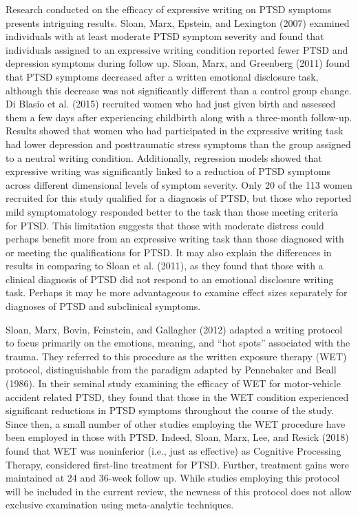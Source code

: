 \documentclass[,man]{apa6}
\begin{document}
Research conducted on the efficacy of expressive writing on PTSD symptoms presents intriguing results. Sloan, Marx, Epstein, and Lexington (2007) examined individuals with at least moderate PTSD symptom severity and found that individuals assigned to an expressive writing condition reported fewer PTSD and depression symptoms during follow up. Sloan, Marx, and Greenberg (2011) found that PTSD symptoms decreased after a written emotional disclosure task, although this decrease was not significantly different than a control group change. Di Blasio et al. (2015) recruited women who had just given birth and assessed them a few days after experiencing childbirth along with a three-month follow-up. Results showed that women who had participated in the expressive writing task had lower depression and posttraumatic stress symptoms than the group assigned to a neutral writing condition. Additionally, regression models showed that expressive writing was significantly linked to a reduction of PTSD symptoms across different dimensional levels of symptom severity. Only 20 of the 113 women recruited for this study qualified for a diagnosis of PTSD, but those who reported mild symptomatology responded better to the task than those meeting criteria for PTSD. This limitation suggests that those with moderate distress could perhaps benefit more from an expressive writing task than those diagnosed with or meeting the qualifications for PTSD. It may also explain the differences in results in comparing to Sloan et al. (2011), as they found that those with a clinical diagnosis of PTSD did not respond to an emotional disclosure writing task. Perhaps it may be more advantageous to examine effect sizes separately for diagnoses of PTSD and subclinical symptoms.

Sloan, Marx, Bovin, Feinstein, and Gallagher (2012) adapted a writing protocol to focus primarily on the emotions, meaning, and \enquote{hot spots} associated with the trauma. They referred to this procedure as the written exposure therapy (WET) protocol, distinguishable from the paradigm adapted by Pennebaker and Beall (1986). In their seminal study examining the efficacy of WET for motor-vehicle accident related PTSD, they found that those in the WET condition experienced significant reductions in PTSD symptoms throughout the course of the study. Since then, a small number of other studies employing the WET procedure have been employed in those with PTSD. Indeed, Sloan, Marx, Lee, and Resick (2018) found that WET was noninferior (i.e., just as effective) as Cognitive Processing Therapy, considered first-line treatment for PTSD. Further, treatment gains were maintained at 24 and 36-week follow up. While studies employing this protocol will be included in the current review, the newness of this protocol does not allow exclusive examination using meta-analytic techniques.
\end{document}
